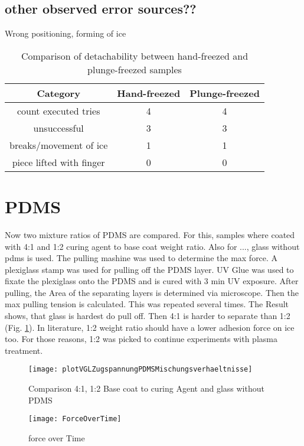 \subsection{other observed error sources??}

Wrong positioning, forming of ice

\begin{table}
	\centering
	\begin{tabular}{|c|c|c|}
		\hline
		Category & Hand-freezed & Plunge-freezed \\
		\hline
		\hline
		count executed tries & 4 & 4\\
		\hline
		unsuccessful & 3 & 3\\
		\hline
		breaks/movement of ice & 1 & 1\\
		\hline
		piece lifted with finger & 0 & 0\\
		\hline		
	\end{tabular}
	\caption{Comparison of detachability between hand-freezed and plunge-freezed samples}
\end{table}

\section{PDMS}

Now two mixture ratios of PDMS are compared. For this, samples where coated with 4:1 and 1:2 curing agent to base coat weight ratio. Also for ..., glass without pdms is used. The pulling mashine was used to determine the max force. A plexiglass stamp was used for pulling off the PDMS layer. UV Glue was used to fixate the plexiglass onto the PDMS and is cured with 3 min UV exposure. After pulling, the Area of the separating layers is determined via microscope. Then the max pulling tension is calculated. This was repeated several times. The Result shows, that glass is hardest do pull off. Then 4:1 is harder to separate than 1:2 (Fig. \ref{fig:vgl4:1zu1:2zuGlas}). In literature, 1:2 weight ratio should have a lower adhesion force on ice too\cite{IbanezIbanez.2022}. For those reasons, 1:2 was picked to continue experiments with plasma treatment.

\begin{figure}
	\centering
	\texttt{[image: plotVGLZugspannungPDMSMischungsverhaeltnisse]}
	\caption{Comparison 4:1, 1:2 Base coat to curing Agent and glass without PDMS}
	\label{fig:vgl4:1zu1:2zuGlas}
\end{figure}

\begin{figure}
	\centering
	\texttt{[image: ForceOverTime]}
	\caption{force over Time}
\end{figure}

